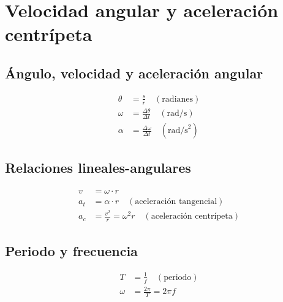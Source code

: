 \section{Velocidad angular y aceleración centrípeta}

\subsection{Ángulo, velocidad y aceleración angular}
\begin{align}
    \theta &= \frac{s}{r} \quad (\text{radianes}) \\
    \omega &= \frac{\Delta \theta}{\Delta t} \quad (\text{rad/s}) \\
    \alpha &= \frac{\Delta \omega}{\Delta t} \quad (\text{rad/s}^2)
\end{align}

\subsection{Relaciones lineales-angulares}
\begin{align}
    v &= \omega \cdot r \\
    a_t &= \alpha \cdot r \quad (\text{aceleración tangencial}) \\
    a_c &= \frac{v^2}{r} = \omega^2 r \quad (\text{aceleración centrípeta})
\end{align}

\subsection{Periodo y frecuencia}
\begin{align}
    T &= \frac{1}{f} \quad (\text{periodo}) \\
    \omega &= \frac{2\pi}{T} = 2\pi f
\end{align}


